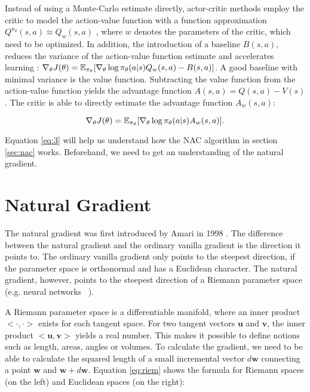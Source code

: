 Instead of using a Monte-Carlo estimate directly, actor-critic methods employ the critic to model the action-value function with a function approximation $Q^{\pi_\theta}(s, a) \approx Q_w(s,a)$ \citep{sutton2000policy}, where $w$ denotes the parameters of the critic, which need to be optimized. In addition, the introduction of a baseline $B(s,a)$, reduces the variance of the action-value function estimate and accelerates learning \citep{sutton2018reinforcement}: \(
\nabla_{\theta}J(\theta)=\operatorname{\mathbb{E}}_{\pi_{\theta}}[\nabla_{\theta}\log\pi_{\theta}(a|s) Q_w(s, a) - B(s,a)]\). A good baseline with minimal variance is the value function. Subtracting the value function from the action-value function yields the advantage function $A(s,a) = Q(s,a)-V(s)$. The critic is able to directly estimate the advantage function $A_w(s,a)$:

\begin{equation}
	\label{eq:3}
	\nabla_{\theta}J(\theta)=\operatorname{\mathbb{E}}_{\pi_{\theta}}[\nabla_{\theta}\log\pi_{\theta}(a|s) A_w(s, a)].
\end{equation}

\noindent Equation \ref{eq:3} will help us understand how the NAC algorithm in section \ref{sec:nac} works. Beforehand, we need to get an understanding of the natural gradient.

\section{Natural Gradient}
\label{sec:NG}

The natural gradient was first introduced by Amari in 1998 \cite{amari1998natural}. The difference between the natural gradient and the ordinary vanilla gradient is the direction it points to. The ordinary vanilla gradient only points to the steepest direction, if the parameter space is orthonormal and has a Euclidean character. The natural gradient, however, points to the steepest direction of a Riemann parameter space (e.g. neural networks  \citep{amari1998natural}).

A Riemann parameter space is a differentiable manifold, where an inner product $<\cdot , \cdot >$ exists for each tangent space. For two tangent vectors $\mathbf{u}$ and $\mathbf{v}$, the inner product $<\mathbf{u}, \mathbf{v}>$ yields a real number. This makes it possible to define notions such as length, areas, angles or volumes. To calculate the gradient, we need to be able to calculate the squared length of a small incremental vector $d\textbf{w}$ connecting a point $\textbf{w}$ and $\textbf{w} + d\textbf{w}$. Equation \ref{eq:riem} shows the formula for Riemann spaces (on the left) and Euclidean spaces (on the right):

